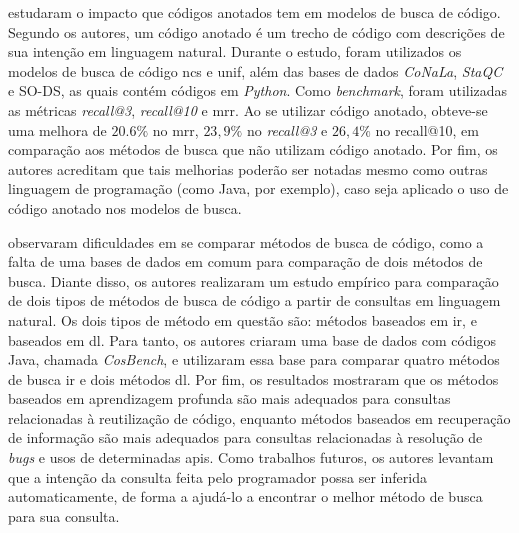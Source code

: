 \textcite{Heyman2020NeuralCS} estudaram o impacto que códigos anotados tem em modelos de busca de código. Segundo os autores, um código anotado é um trecho de código com descrições de sua intenção em linguagem natural. Durante o estudo, foram utilizados os modelos de busca de código \gls{ncs} e \gls{unif}, além das bases de dados \textit{CoNaLa}, \textit{StaQC} \cite{Yao2018StaQCAS} e SO-DS, as quais contém códigos em \emph{Python}. Como \emph{benchmark}, foram utilizadas as métricas \textit{recall@3}, \textit{recall@10} e \gls{mrr}. Ao se utilizar código anotado, obteve-se uma melhora de $20.6\%$ no \gls{mrr}, $23,9\%$ no \textit{recall@3} e $26,4\%$ no recall@10, em comparação aos métodos de busca que não utilizam código anotado. Por fim, os autores acreditam que tais melhorias poderão ser notadas mesmo como outras linguagem de programação (como Java, por exemplo), caso seja aplicado o uso de código anotado nos modelos de busca.

\textcite{Yan2020AreTC} observaram dificuldades em se comparar métodos de busca de código, como a falta de uma bases de dados em comum para comparação de dois métodos de busca. Diante disso, os autores realizaram um estudo empírico para comparação de dois tipos de métodos de busca de código a partir de consultas em linguagem natural. Os dois tipos de método em questão são: métodos baseados em \gls{ir}, e baseados em \gls{dl}. Para tanto, os autores criaram uma base de dados com códigos Java, chamada \textit{CosBench}, e utilizaram essa base para comparar quatro métodos de busca \gls{ir} e dois métodos \gls{dl}. Por fim, os resultados mostraram que os métodos baseados em aprendizagem profunda são mais adequados para consultas relacionadas à reutilização de código, enquanto métodos baseados em recuperação de informação são mais adequados para consultas relacionadas à resolução de \emph{bugs} e usos de determinadas \glspl{api}. Como trabalhos futuros, os autores levantam que a intenção da consulta feita pelo programador possa ser inferida automaticamente, de forma a ajudá-lo a encontrar o melhor método de busca para sua consulta.

